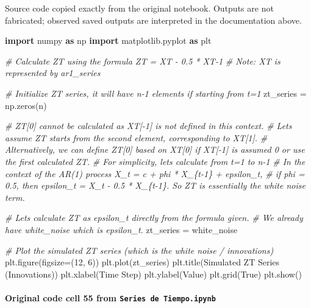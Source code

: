 \documentclass[
  11pt,
]{article}
\newenvironment{Shaded}{}{}
\newcommand{\CommentTok}[1]{\textcolor[rgb]{0.38,0.63,0.69}{\textit{#1}}}
\newcommand{\DecValTok}[1]{\textcolor[rgb]{0.25,0.63,0.44}{#1}}
\newcommand{\ImportTok}[1]{\textcolor[rgb]{0.00,0.50,0.00}{\textbf{#1}}}
\newcommand{\NormalTok}[1]{#1}
\newcommand{\OperatorTok}[1]{\textcolor[rgb]{0.40,0.40,0.40}{#1}}
\newcommand{\StringTok}[1]{\textcolor[rgb]{0.25,0.44,0.63}{#1}}
\newcommand{\VariableTok}[1]{\textcolor[rgb]{0.10,0.09,0.49}{#1}}
\begin{document}
Source code copied exactly from the original notebook. Outputs are not fabricated; observed saved outputs are interpreted in the documentation above.

\begin{Shaded}
\begin{Highlighting}[]
\ImportTok{import}\NormalTok{ numpy }\ImportTok{as}\NormalTok{ np}
\ImportTok{import}\NormalTok{ matplotlib.pyplot }\ImportTok{as}\NormalTok{ plt}

\CommentTok{\# Calculate ZT using the formula ZT = XT {-} 0.5 * XT{-}1}
\CommentTok{\# Note: XT is represented by ar1\_series}

\CommentTok{\# Initialize ZT series, it will have n{-}1 elements if starting from t=1}
\NormalTok{zt\_series }\OperatorTok{=}\NormalTok{ np.zeros(n)}

\CommentTok{\# ZT[0] cannot be calculated as XT[{-}1] is not defined in this context.}
\CommentTok{\# Let\textquotesingle{}s assume ZT starts from the second element, corresponding to XT[1].}
\CommentTok{\# Alternatively, we can define ZT[0] based on XT[0] if XT[{-}1] is assumed 0 or use the first calculated ZT.}
\CommentTok{\# For simplicity, let\textquotesingle{}s calculate from t=1 to n{-}1}
\CommentTok{\# In the context of the AR(1) process X\_t = c + phi * X\_\{t{-}1\} + epsilon\_t,}
\CommentTok{\# if phi = 0.5, then epsilon\_t = X\_t {-} 0.5 * X\_\{t{-}1\}. So ZT is essentially the white noise term.}

\CommentTok{\# Let\textquotesingle{}s calculate ZT as epsilon\_t directly from the formula given.}
\CommentTok{\# We already have white\_noise which is epsilon\_t.}
\NormalTok{zt\_series }\OperatorTok{=}\NormalTok{ white\_noise}

\CommentTok{\# Plot the simulated ZT series (which is the white noise / innovations)}
\NormalTok{plt.figure(figsize}\OperatorTok{=}\NormalTok{(}\DecValTok{12}\NormalTok{, }\DecValTok{6}\NormalTok{))}
\NormalTok{plt.plot(zt\_series)}
\NormalTok{plt.title(}\StringTok{\textquotesingle{}Simulated ZT Series (Innovations)\textquotesingle{}}\NormalTok{)}
\NormalTok{plt.xlabel(}\StringTok{\textquotesingle{}Time Step\textquotesingle{}}\NormalTok{)}
\NormalTok{plt.ylabel(}\StringTok{\textquotesingle{}Value\textquotesingle{}}\NormalTok{)}
\NormalTok{plt.grid(}\VariableTok{True}\NormalTok{)}
\NormalTok{plt.show()}
\end{Highlighting}
\end{Shaded}

\paragraph{\texorpdfstring{Original code cell 55 from \texttt{Series\ de\ Tiempo.ipynb}}{Original code cell 55 from Series de Tiempo.ipynb}}\label{original-code-cell-55-from-series-de-tiempoipynb}
\end{document}
